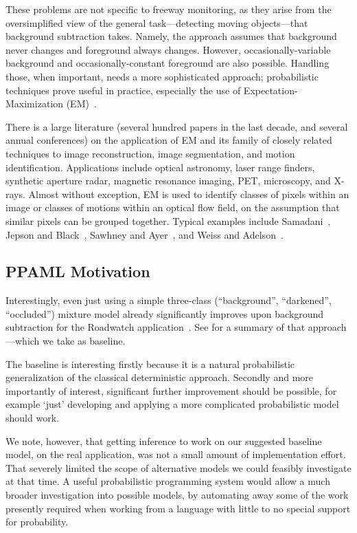 These problems are not specific to freeway monitoring, as they arise
from the oversimplified view of the 
general task---detecting moving objects---that
background subtraction takes.  Namely, the approach assumes that
background never changes and foreground always changes.  However,
occasionally-variable background and occasionally-constant 
foreground are also possible.  Handling those, when important, needs a
more sophisticated approach; probabilistic techniques prove useful in practice,
especially the use of Expectation-Maximization (EM)~\cite{Dempster+al:1977}.

There is a large literature (several hundred papers in the last
decade, and several annual conferences) on the application
of EM and its family of closely related techniques
to image reconstruction, image segmentation, and
motion identification.   Applications include optical astronomy, laser
range finders, synthetic aperture radar, magnetic resonance imaging, PET, microscopy, and
X-rays.  Almost without exception, EM is used to identify classes of
pixels within an image or classes of motions within an optical flow
field, on the assumption that similar pixels can be grouped
together. Typical examples include Samadani~,
Jepson and Black~, Sawhney and
Ayer~, and Weiss and
Adelson~.

\subsection{PPAML Motivation}

Interestingly, even just using a simple three-class (``background'', ``darkened'',
``occluded'') mixture model already significantly improves upon
background subtraction for the Roadwatch application~\cite{friedman97uai}.  See
 for a summary of
that approach---which we take as baseline.

The baseline is interesting firstly because it is a natural
probabilistic generalization of the 
classical deterministic approach.
Secondly and more importantly of interest, significant further
improvement should be possible, for example `just' developing and
applying a more complicated probabilistic model should work.

We note, however, that getting inference to work on our suggested baseline
model, on the real application, was not a small amount of
implementation effort.  That severely limited the scope of alternative models we could
feasibly investigate at that time.  A useful probabilistic programming
system would allow a much broader investigation into possible models,
by automating away some of the work presently required when working
from a language with little to no special support for probability.


